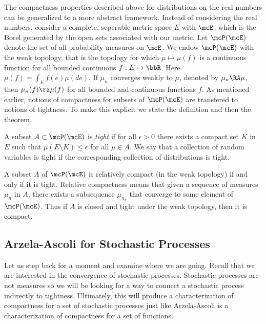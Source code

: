 \documentclass{report}
\begin{document}
The compactness properties described above for distributions on the
real numbers can be generalized to a more abstract framework.  Instead
of considering the real numbers, consider a complete, seperable metric
space $E$ with \sigalg $\mcE$, which is the Borel \sigalg generated by
the open sets associated with our metric.  Let $\mcP(\mcE)$ denote the
set of all probability measures on $\mcE$.  We endow $\mcP(\mcE)$ with
the weak topology, that is the topology for which $\mu \mapsto \mu(f)$
is a continuous function for all bounded continuous $f : E \mapsto
\bbR$.  Here $\mu(f) = \int_E f(e) \mu(de)$.  If $\mu_n$ converges
weakly to $\mu$, denoted by $\mu_n \RA \mu$, then $\mu_n(f) \ra
\mu(f)$ for all bounded and continuous functions $f$.  As mentioned
earlier, notions of compactness for subsets of $\mcP(\mcE)$ are
transfered to notions of tightness.  To make this explicit we state
the definition and then the theorem.

\begin{definition}
A subset $A \subset \mcP(\mcE)$ is \emph{tight} if for all $\epsilon >
0$ there exists a compact set $K$ in $E$ such that $\mu(E \setminus K)
\leq \epsilon$ for all $\mu \in A$.  We say that a collection of
random variables is tight if the corresponding collection of
distributions is tight.
\end{definition}

\begin{theorem}
A subset $A$ of $\mcP(\mcE)$ is relatively compact (in the weak
topology) if and only if it is tight.  Relative compactness means that
given a sequence of measures $\mu_n$ in $A$, there exists a
subsequence $\mu_{n_k}$ that converge to some element of $\mcP(\mcE)$. 
Thus if $A$ is closed and tight under the weak topology, then it is
compact. 
\end{theorem}

\subsection{Arzela-Ascoli for Stochastic Processes}

Let us step back for a moment and examine where we are going.  Recall
that we are interested in the convergence of stochastic processes. 
Stochastic processes are not measures so we will be looking for a way
to connect a stochastic process indirectly to tightness.  Ultimately,
this will produce a characterization of compactness for a set of
stochastic processes just like Arzela-Ascoli is a characterization of
compactness for a set of functions.
\end{document}
